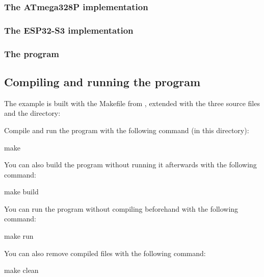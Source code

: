 \subsubsection{The ATmega328P implementation}

\subsubsection{The ESP32-S3 implementation}

\subsubsection{The program}

\subsection{Compiling and running the program}
\label{c3:sec:examplebuild}
The example is built with the Makefile from , extended with the three source
files and the  directory:


\noindent Compile and run the program with the following command (in this directory):

\begin{shell}
make
\end{shell}

\noindent You can also build the program without running it afterwards with the following command:

\begin{shell}
make build
\end{shell}

\noindent You can run the program without compiling beforehand with the following command:

\begin{shell}
make run
\end{shell}

\noindent You can also remove compiled files with the following command:

\begin{shell}
make clean
\end{shell}
